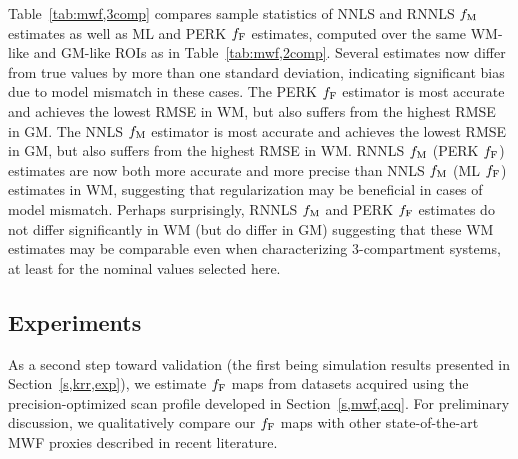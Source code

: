 Table~\ref{tab:mwf,3comp} compares sample statistics
of NNLS and RNNLS $f_\mathrm{M}$ estimates
as well as ML and PERK $f_{\mathrm{F}}$ estimates,
computed over the same WM-like and GM-like ROIs
as in Table~\ref{tab:mwf,2comp}.
Several estimates now differ from true values
by more than one standard deviation,
indicating significant bias due to model mismatch
in these cases.
The PERK $f_{\mathrm{F}}$ estimator is most accurate 
and achieves the lowest RMSE in WM,
but also suffers from the highest RMSE in GM.
The NNLS $f_\mathrm{M}$ estimator is most accurate
and achieves the lowest RMSE in GM,
but also suffers from the highest RMSE in WM.
RNNLS $f_\mathrm{M}$ (PERK $f_{\mathrm{F}}$) estimates are now
both more accurate and more precise
than NNLS $f_\mathrm{M}$ (ML $f_{\mathrm{F}}$) estimates
in WM,
suggesting that regularization may be beneficial
in cases of model mismatch.
Perhaps surprisingly,
RNNLS $f_\mathrm{M}$ and PERK $f_{\mathrm{F}}$ estimates 
do not differ significantly in WM
(but do differ in GM)
suggesting that these WM estimates may be comparable
even when characterizing 3-compartment systems,
at least for the nominal values selected here.

\subsection{\Invivo Experiments}
\label{ss,mwf,exp,invivo}

As a second step toward validation
(the first being simulation results 
presented in Section~\ref{s,krr,exp}),
we estimate $f_{\mathrm{F}}$ maps
from \invivo datasets acquired
using the precision-optimized scan profile
developed in Section~\ref{s,mwf,acq}.
For preliminary discussion,
we qualitatively compare our $f_{\mathrm{F}}$ maps 
with other state-of-the-art MWF proxies
described in recent literature.

